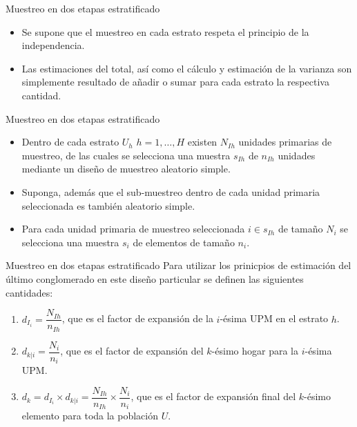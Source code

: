 \documentclass[
  english,
  ignorenonframetext,
]{beamer}
\providecommand{\tightlist}{%
  \setlength{\itemsep}{0pt}\setlength{\parskip}{0pt}}
\begin{document}
\begin{frame}{Muestreo en dos etapas estratificado}
\protect\hypertarget{muestreo-en-dos-etapas-estratificado-1}{}
\begin{itemize}
\tightlist
\item
  Se supone que el muestreo en cada estrato respeta el principio de la
  independencia.
\item
  Las estimaciones del total, así como el cálculo y estimación de la
  varianza son simplemente resultado de añadir o sumar para cada estrato
  la respectiva cantidad.
\end{itemize}
\end{frame}

\begin{frame}{Muestreo en dos etapas estratificado}
\protect\hypertarget{muestreo-en-dos-etapas-estratificado-2}{}
\begin{itemize}
\tightlist
\item
  Dentro de cada estrato \(U_h\) \(h=1,\ldots, H\) existen \(N_{Ih}\)
  unidades primarias de muestreo, de las cuales se selecciona una
  muestra \(s_{Ih}\) de \(n_{Ih}\) unidades mediante un diseño de
  muestreo aleatorio simple.
\item
  Suponga, además que el sub-muestreo dentro de cada unidad primaria
  seleccionada es también aleatorio simple.
\item
  Para cada unidad primaria de muestreo seleccionada \(i\in s_{Ih}\) de
  tamaño \(N_i\) se selecciona una muestra \(s_i\) de elementos de
  tamaño \(n_i\).
\end{itemize}
\end{frame}

\begin{frame}{Muestreo en dos etapas estratificado}
\protect\hypertarget{muestreo-en-dos-etapas-estratificado-3}{}
Para utilizar los prinicpios de estimación del último conglomerado en
este diseño particular se definen las siguientes cantidades:

\begin{enumerate}
\tightlist
\item
  \(d_{I_i} = \dfrac{N_{Ih}}{n_{Ih}}\), que es el factor de expansión de
  la \(i\)-ésima UPM en el estrato \(h\).
\item
  \(d_{k|i} = \dfrac{N_{i}}{n_{i}}\), que es el factor de expansión del
  \(k\)-ésimo hogar para la \(i\)-ésima UPM.
\item
  \(d_k = d_{I_i} \times d_{k|i} = \dfrac{N_{Ih}}{n_{Ih}} \times \dfrac{N_{i}}{n_{i}}\),
  que es el factor de expansión final del \(k\)-ésimo elemento para toda
  la población \(U\).
\end{enumerate}
\end{frame}
\end{document}
